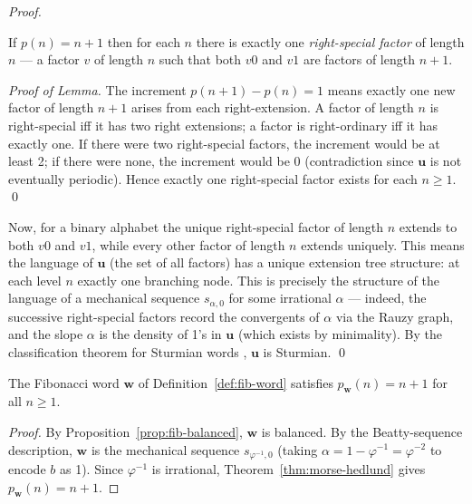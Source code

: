 \begin{proof}
  \begin{lemma}\label{lem:right-special}
    If \(p(n)=n+1\) then for each \(n\) there is exactly one
    \emph{right-special factor} of length \(n\) --- a factor \(v\)
    of length \(n\) such that both \(v0\) and \(v1\) are factors
    of length \(n+1\).
  \end{lemma}
  \begin{proof}[Proof of Lemma]
    The increment \(p(n+1)-p(n)=1\) means exactly one new factor of
    length \(n+1\) arises from each right-extension.  A factor of
    length \(n\) is right-special iff it has two right extensions; a
    factor is right-ordinary iff it has exactly one.  If there were
    two right-special factors, the increment would be at least 2;
    if there were none, the increment would be 0 (contradiction since
    \(\mathbf{u}\) is not eventually periodic).  Hence exactly one
    right-special factor exists for each \(n\geq 1\). \qed
  \end{proof}

  Now, for a binary alphabet the unique right-special factor of
  length \(n\) extends to both \(v0\) and \(v1\), while every other
  factor of length \(n\) extends uniquely.  This means the language
  of \(\mathbf{u}\) (the set of all factors) has a unique extension
  tree structure: at each level \(n\) exactly one branching node.
  This is precisely the structure of the language of a mechanical
  sequence \(s_{\alpha,0}\) for some irrational \(\alpha\) — indeed,
  the successive right-special factors record the convergents of
  \(\alpha\) via the Rauzy graph, and the slope \(\alpha\) is the
  density of 1's in \(\mathbf{u}\) (which exists by minimality).
  By the classification theorem for Sturmian words
  \cite[\S2.1]{lothaire2002algebraic}, \(\mathbf{u}\) is Sturmian.
  \qed
\end{proof}

\begin{corollary}%
  \label{cor:fib-complexity}
  The Fibonacci word \(\mathbf{w}\) of Definition~\ref{def:fib-word}
  satisfies \(p_{\mathbf{w}}(n)=n+1\) for all \(n\geq 1\).
\end{corollary}
\begin{proof}
  By Proposition~\ref{prop:fib-balanced}, \(\mathbf{w}\) is balanced.
  By the Beatty-sequence description, \(\mathbf{w}\) is the mechanical
  sequence \(s_{\varphi^{-1},0}\) (taking \(\alpha=1-\varphi^{-1}=\varphi^{-2}\)
  to encode \(b\) as 1).  Since \(\varphi^{-1}\) is irrational,
  Theorem~\ref{thm:morse-hedlund} gives \(p_{\mathbf{w}}(n)=n+1\).
\end{proof}


